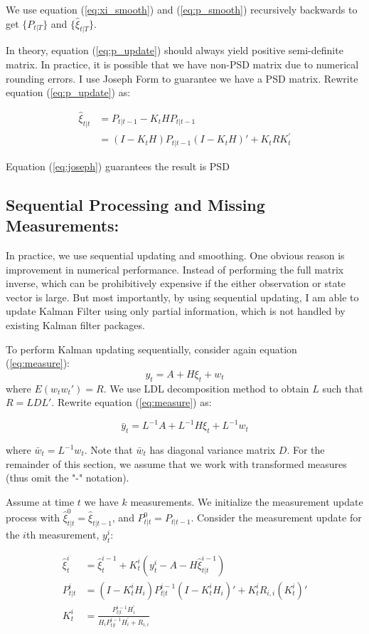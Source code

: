 \documentclass[12pt]{article}
\numberwithin{equation}{section}
\begin{document}
We use equation (\ref{eq:xi_smooth}) and (\ref{eq:p_smooth}) recursively backwards to get $\{P_{t|T}\}$ and $\{\hat{\xi}_{t|T}\}$. 

In theory, equation (\ref{eq:p_update}) should always yield positive semi-definite matrix. In practice, it is possible that we have non-PSD matrix due to numerical rounding errors. I use Joseph Form to guarantee we have a PSD matrix. Rewrite equation (\ref{eq:p_update}) as:

\begin{align} 
    \hat{\xi}_{t|t} & = P_{t|t-1} - K_tHP_{t|t-1} \nonumber \\
    & = (I-K_tH)P_{t|t-1}(I-K_tH)'+K_tRK_t^{'} \label{eq:joseph}
\end{align}

Equation (\ref{eq:joseph}) guarantees the result is PSD 

\subsection{Sequential Processing and Missing Measurements:} \label{subsec:seq}

In practice, we use sequential updating and smoothing. One obvious reason is improvement in numerical performance. Instead of performing the full matrix inverse, which can be prohibitively expensive if the either observation or state vector is large. But most importantly, by using sequential updating, I am able to update Kalman Filter using only partial information, which is not handled by existing Kalman filter packages. 

To perform Kalman updating sequentially, consider again equation (\ref{eq:measure}):
\[
    y_t = A + H\xi_{t} + w_t 
\]
where $E(w_{t}w_{t}')=R$. We use LDL decomposition method to obtain $L$ such that $R=LDL'$. Rewrite equation (\ref{eq:measure}) as:

\[
    \bar{y}_t = L^{-1}A + L^{-1}H\xi_{t} + L^{-1}w_t
\]

where $\bar{w}_t = L^{-1}w_t$. Note that $\bar{w}_t$ has diagonal variance matrix $D$. For the remainder of this section, we assume that we work with transformed measures (thus omit the "-" notation).

Assume at time $t$ we have $k$ measurements. We initialize the measurement update process with $\hat{\xi}_{t|t}^0=\hat{\xi}_{t|t-1}$, and $P_{t|t}^0=P_{t|t-1}$. Consider the measurement update for the $i$th measurement, $y_t^i$:

\begin{align*}
    \hat{\xi}_{t}^i & = \hat{\xi}_{t}^{i-1} + K_t^i(y_t^i - A - H\hat{\xi}_{t|t}^{i-1}) \\
    P_{t|t}^{i} & = (I - K_t^iH_i)P_{t|t}^{i-1}(I-K_t^iH_i)' + K_t^{i}R_{i,i}(K_t^{i})' \\
    K_t^i & = \frac{P_{t|t}^{i-1}H_i^{'}}{H_{i}P_{t|t}^{i-1}H_{i}^{'}+R_{i,i}}
\end{align*}
\end{document}
